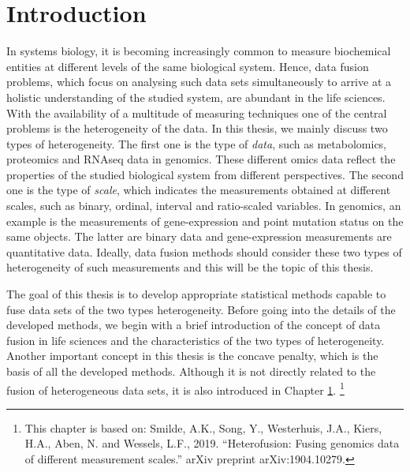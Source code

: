 \chapter{Introduction} \label{chapter:1}
In systems biology, it is becoming increasingly common to measure biochemical entities at different levels of the same biological system. Hence, data fusion problems, which focus on analysing such data sets simultaneously to arrive at a holistic understanding of the studied system, are abundant in the life sciences. With the availability of a multitude of measuring techniques one of the central problems is the heterogeneity of the data. In this thesis, we mainly discuss two types of heterogeneity. The first one is the type of \emph{data}, such as metabolomics, proteomics and RNAseq data in genomics. These different omics data reflect the properties of the studied biological system from different perspectives. The second one is the type of \emph{scale}, which indicates the measurements obtained at different scales, such as binary, ordinal, interval and ratio-scaled variables. In genomics, an example is the measurements of gene-expression and point mutation status on the same objects. The latter are binary data and gene-expression measurements are quantitative data. Ideally, data fusion methods should consider these two types of heterogeneity of such measurements and this will be the topic of this thesis.

The goal of this thesis is to develop appropriate statistical methods capable to fuse data sets of the two types heterogeneity. Before going into the details of the developed methods, we begin with a brief introduction of the concept of data fusion in life sciences and the characteristics of the two types of heterogeneity. Another important concept in this thesis is the concave penalty, which is the basis of all the developed methods. Although it is not directly related to the fusion of heterogeneous data sets, it is also introduced in Chapter \ref{chapter:1}. \footnote{This chapter is based on: Smilde, A.K., Song, Y., Westerhuis, J.A., Kiers, H.A., Aben, N. and Wessels, L.F., 2019. ``Heterofusion: Fusing genomics data of different measurement scales.'' arXiv preprint arXiv:1904.10279.}

